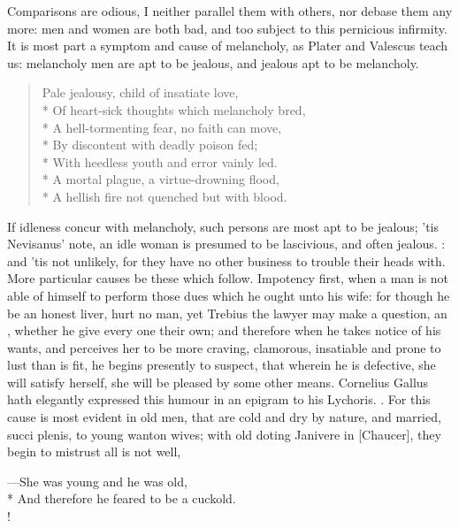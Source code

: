 Comparisons are odious, I neither parallel them with others, nor debase
them any more: men and women are both bad, and too subject to this
pernicious infirmity. It is most part a symptom and cause of
melancholy, as Plater and Valescus teach us: melancholy men are apt to
be jealous, and jealous apt to be melancholy.

\begin{verse}
Pale jealousy, child of insatiate love,\\*
Of heart-sick thoughts which melancholy bred,\\*
A hell-tormenting fear, no faith can move,\\*
By discontent with deadly poison fed;\\*
With heedless youth and error vainly led.\\*
A mortal plague, a virtue-drowning flood,\\*
A hellish fire not quenched but with blood.
\end{verse}

If idleness concur with melancholy, such persons are most apt to be
jealous; 'tis Nevisanus' note, an idle woman is presumed to be
lascivious, and often jealous. :
and 'tis not unlikely, for they have no other business to trouble their
heads with.
%
More particular causes be these which follow. Impotency first, when a
man is not able of himself to perform those dues which he ought unto
his wife: for though he be an honest liver, hurt no man, yet Trebius
the lawyer may make a question, an , whether he give
every one their own; and therefore when he takes notice of his wants,
and perceives her to be more craving, clamorous, insatiable and prone
to lust than is fit, he begins presently to suspect, that wherein he is
defective, she will satisfy herself, she will be pleased by some other
means. Cornelius Gallus hath elegantly expressed this humour in an
epigram to his Lychoris.
%
.
%
For this cause is most evident in old men, that are cold and dry by
nature, and married, succi plenis, to young wanton wives; with old
doting Janivere in [Chaucer], they begin to mistrust all is not well,
%
{\gothfont%
\begin{versewithlinenos}{2}{1}{1}%
---She was young and he was old,\\*
And therefore he feared to be a cuckold.\\!
\end{versewithlinenos}%
}%

